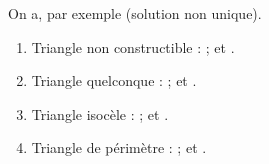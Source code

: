 \begin{colonne*exercice}
\begin{corrige}
   On a, par exemple (solution non unique).
   \begin{enumerate}
      \item Triangle non constructible : {\blue {} ;  et }.
      \item Triangle quelconque : {\blue {} ;  et }.
      \item Triangle isocèle : {\blue {} ;  et }.
      \item Triangle de périmètre  : {\blue {} ;  et }.
   \end{enumerate}
\end{corrige}

\smallskip


%
%



\end{colonne*exercice}
